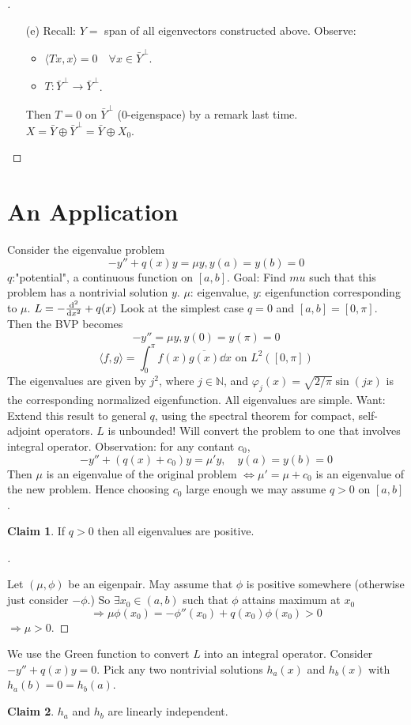 \documentclass{article}
\theoremstyle{definition}
\newtheorem*{clm}{Claim}
\newenvironment{proofs}[1][\proofname]{%
  \begin{proof}[#1]$ $\par\nobreak\ignorespaces
}{%
  \end{proof}
}
\newcommand{\NN}{\mathbb N}
\begin{document}
\begin{proofs}
\begin{enumerate}
		\item[(e)] Recall: $Y = $ span of all eigenvectors constructed above.
			Observe: 
			\begin{itemize}
				\item $\langle T x, x \rangle = 0 \quad \forall x \in \bar{Y}^{\perp}$.

				\item $T: \bar{Y}^{\perp} \to \bar{Y}^{\perp}$.
			\end{itemize}
			Then $T = 0$ on $\bar{Y}^\perp$ (0-eigenspace) by a remark last time.
			$X = \bar{Y} \oplus \bar{Y}^\perp = \bar{Y} \oplus X_0$.
	\end{enumerate}
\end{proofs}

\section{An Application}

Consider the eigenvalue problem
\[
	-y'' + q(x) y = \mu y, y(a) = y(b) = 0
\]
$q$:"potential", a continuous function on $[a, b]$.
Goal: Find $mu$ such that this problem has a nontrivial solution $y$.
$\mu$: eigenvalue, $y$: eigenfunction corresponding to $\mu$.
$L = -\dv[2]{x} + q(x)$
Look at the simplest case $q = 0$ and $[a, b] = [0, \pi]$.
Then the BVP becomes
\[
	-y'' = \mu y, y(0) = y(\pi) = 0
\]
\[
	\langle f, g \rangle = \int_0^\pi f(x) \overline{g(x)} \dd{x} \text{ on } L^2([0, \pi]) 
\]
The eigenvalues are given by $j^2$, where $j \in \NN$, and $\varphi_j(x) = \sqrt{2/\pi} \sin(jx)$ is the corresponding normalized eigenfunction.
All eigenvalues are simple.
Want: Extend this result to general $q$, using the spectral theorem for compact, self-adjoint operators.
$L$ is unbounded!
Will convert the problem to one that involves integral operator.
Observation: for any contant $c_0$, 
\[
	- y'' + (q(x) + c_0) y = \mu' y, \quad y(a) = y(b) = 0
\]
Then $\mu$ is an eigenvalue of the original problem $\Leftrightarrow \mu' = \mu + c_0$ is an eigenvalue of the new problem.
Hence choosing $c_0$ large enough we may assume $q > 0$ on $[a, b]$.
\begin{clm}
	If $q > 0$ then all eigenvalues are positive.
\end{clm}
\begin{proofs}
	Let $(\mu, \phi)$ be an eigenpair.
	May assume that $\phi$ is positive somewhere (otherwise just consider $- \phi$.)
	So $\exists x_0 \in (a, b)$ such that $\phi$ attains maximum at $x_0$
	\[
		\Rightarrow \mu \phi(x_0) = - \phi''(x_0) + q(x_0) \phi(x_0) > 0
	\]
	$\Rightarrow \mu > 0$.
\end{proofs}
We use the Green function to convert $L$ into an integral operator.
Consider $-y'' + q(x) y = 0$.
Pick any two nontrivial solutions $h_a(x)$ and $h_b(x)$ with $h_a(b) = 0 = h_b(a)$.
\begin{clm}
	$h_a$ and $h_b$ are linearly independent.
\end{clm}
\end{document}
